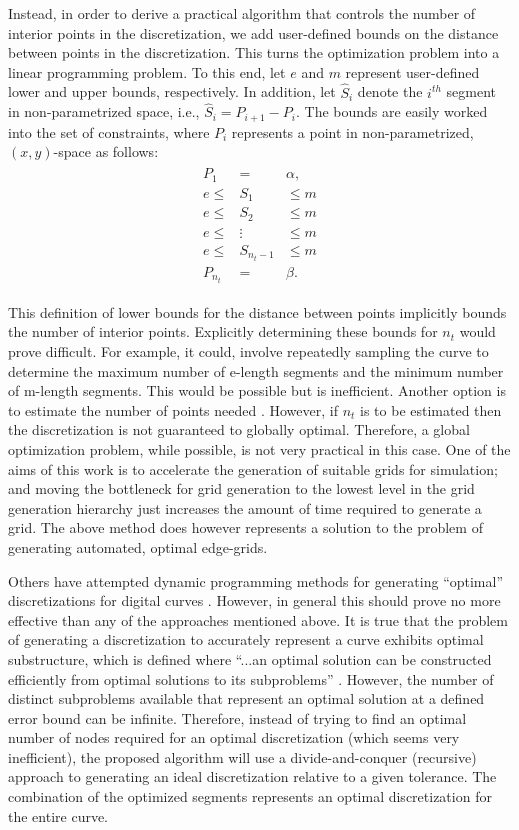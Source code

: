Instead, in order to derive a practical algorithm that controls the 
number of interior points in the discretization, we add user-defined 
bounds on the distance between points in the discretization.  This turns 
the optimization problem into a linear programming problem.  To this end, 
let $e$ and $m$ represent user-defined lower and upper bounds, 
respectively.  In addition, let $\hat{S}_i$ denote the $i^{th}$ segment 
in non-parametrized space, i.e., $\hat{S}_i = P_{i+1}-P_i$.  The bounds 
are easily worked into the set of constraints, where $P_i$ represents a 
point in non-parametrized, $(x,y)$-space as follows: 
\begin{eqnarray*} 
\begin{array}{rcl} 
P_1 & = & \alpha,\\ 
e \leq & S_1 & \leq m \\ 
e \leq & S_2 & \leq m \\ 
e \leq & \vdots & \leq m \\ 
e \leq & S_{n_t-1} & \leq m \\ 
P_{n_t} & = & \beta. 
\end{array} 
\end{eqnarray*}

This definition of lower bounds for the distance between points 
implicitly bounds the number of interior points.  Explicitly determining 
these bounds for $n_t$ would prove difficult. For example, it 
could, involve repeatedly sampling the curve to 
determine the maximum number of e-length segments and the minimum number 
of m-length segments. This would be possible but is inefficient. Another 
option is to estimate the number of points needed \cite{cuilliere97}. 
However, if $n_t$ is to be estimated then the discretization is not 
guaranteed to globally optimal. Therefore, a global optimization problem, 
while possible, is not very practical in this case. One of the aims of 
this work is to accelerate the generation of suitable grids for 
simulation; and moving the bottleneck for grid generation to the lowest 
level in the grid generation hierarchy just increases the amount of time 
required to generate a grid. The above method does however represents a 
solution to the problem of generating automated, optimal edge-grids.

Others have attempted dynamic programming methods for generating 
``optimal'' discretizations for digital curves \cite{horng02}. However, in 
general this should prove no more effective than any of the approaches 
mentioned above. It is true that the problem of generating a discretization to accurately represent a curve exhibits optimal substructure, 
which is defined where ``...an optimal solution can be constructed 
efficiently from optimal solutions to its subproblems'' \cite{cormen01}. 
However, the number of distinct subproblems available that represent an optimal solution at a defined error bound can be infinite. Therefore, instead of trying to find an optimal number of nodes required for an optimal discretization (which seems very inefficient), the proposed algorithm will use a divide-and-conquer (recursive) approach to generating an ideal discretization relative to a given tolerance. The combination of the optimized segments represents an optimal discretization for the entire curve.

